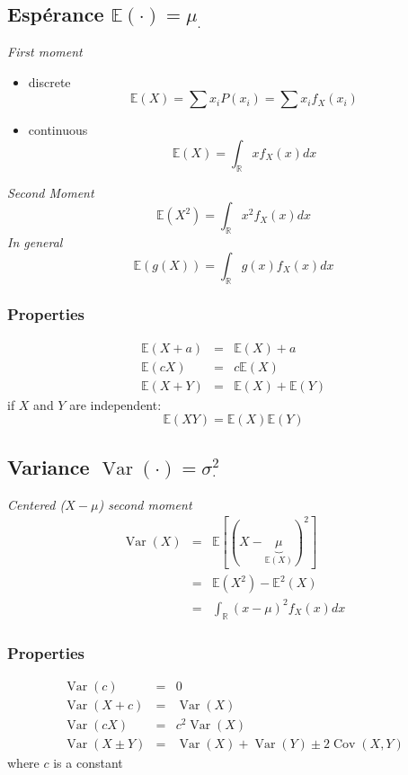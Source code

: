 \documentclass[a4paper,titlepage] {scrartcl}
\begin{document}
\subsection{Espérance $\mathbb E(\cdot)=\mu_{\cdot}$}
\emph{First moment}
\begin{itemize}
	\item discrete
	\begin{equation}
		\mathbb E(X) = \sum x_iP(x_i)=\sum x_if_X(x_i)
	\end{equation}
	\item continuous
	\begin{equation}
		\mathbb E(X) = \int_{\mathbb R} xf_X(x)dx 
	\end{equation}
\end{itemize}
\emph{Second Moment}
\begin{equation}
	\mathbb E(X^2) = \int_{\mathbb R} x^2f_X(x)dx 
\end{equation}
\emph{In general}
\begin{equation}
	\mathbb E(g(X)) = \int_{\mathbb R} g(x)f_X(x)dx
\end{equation}
\subsubsection{Properties}
\begin{eqnarray}
	\mathbb E(X+a) &=& \mathbb E(X)+a\\
	\mathbb E(cX) &=& c\mathbb E(X)\\
	\mathbb E(X+Y) &=& \mathbb E(X) + \mathbb E(Y)
\end{eqnarray}
if $X$ and $Y$ are independent:
\begin{equation}
	\mathbb E(XY) = \mathbb E(X)\mathbb E(Y)
\end{equation}

\subsection{Variance $\mathop{Var}(\cdot)=\sigma_{\cdot}^2$}
\emph{Centered ($X-\mu$) second moment}
\begin{eqnarray}
	\mathop{Var}(X) &=& \mathbb E[(X-\underbrace{\mu}_{\mathbb E(X)})^2]\\
	&=& \mathbb E(X^2)-\mathbb E^2(X)\\
	&=& \int_{\mathbb R}(x-\mu)^2f_X(x)dx
\end{eqnarray}

\subsubsection{Properties}
\begin{eqnarray}
	\mathop{Var}(c) &=& 0\\
	\mathop{Var}(X+c) &=& \mathop{Var}(X)\\
	\mathop{Var}(cX) &=& c^2\mathop{Var}(X)\\
	\mathop{Var}(X\pm Y) &=& \mathop{Var}(X)+\mathop{Var}(Y)\pm 2\mathop{Cov}(X,Y)
\end{eqnarray}
where $c$ is a constant
\end{document}
